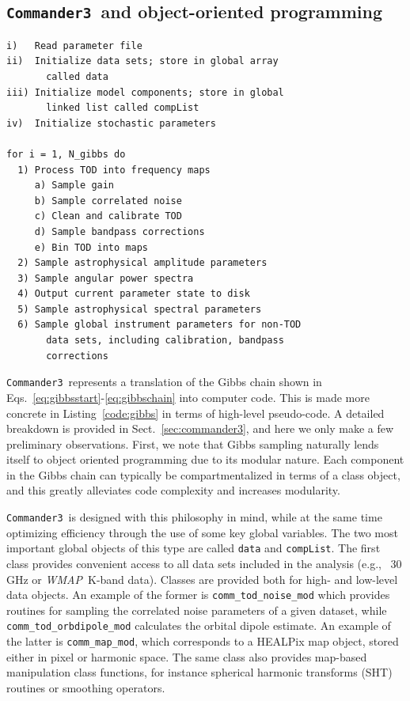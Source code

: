 \documentclass[twocolumn]{aa}
\def\WMAP{\emph{WMAP}}
\def\commanderthree{\texttt{Commander3}}
\begin{document}
\subsection{\commanderthree\ and object-oriented programming}


\newcommand{\find}{\quad}
\newcommand{\ind}{\quad \;}
\begin{lstfloat}[t]
  {\scriptsize
    \begin{tcolorbox}
\begin{lstlisting}
i)   Read parameter file 
ii)  Initialize data sets; store in global array
       called data
iii) Initialize model components; store in global 
       linked list called compList
iv)  Initialize stochastic parameters 

for i = 1, N_gibbs do
  1) Process TOD into frequency maps
     a) Sample gain
     b) Sample correlated noise
     c) Clean and calibrate TOD
     d) Sample bandpass corrections
     e) Bin TOD into maps
  2) Sample astrophysical amplitude parameters
  3) Sample angular power spectra
  4) Output current parameter state to disk
  5) Sample astrophysical spectral parameters
  6) Sample global instrument parameters for non-TOD
       data sets, including calibration, bandpass
       corrections
\end{lstlisting}
    \end{tcolorbox}
}
\caption{Schematic overview of \commanderthree\ execution.}\label{code:gibbs}
\end{lstfloat}

\commanderthree\ represents a translation of the Gibbs chain shown in
Eqs.~\eqref{eq:gibbsstart}-\eqref{eq:gibbschain} into computer code. This is made more concrete
in Listing~\ref{code:gibbs} in terms of high-level pseudo-code. A
detailed breakdown is provided in Sect.~\ref{sec:commander3}, and here
we only make a few preliminary observations. First, we note that Gibbs
sampling naturally lends itself to object oriented programming due to
its modular nature. Each component in the Gibbs chain can typically be
compartmentalized in terms of a class object, and this greatly
alleviates code complexity and increases modularity.

\commanderthree\ is designed with this philosophy in mind, while at
the same time optimizing efficiency through the use of some key global
variables. The two most important global objects of this type are
called \texttt{data} and \texttt{compList}. The first class provides
convenient access to all data sets included in the analysis (e.g.,
\Planck\ 30\,GHz or \WMAP\ K-band data). Classes are provided both for
high- and low-level data objects. An example of the former is
\texttt{comm\_tod\_noise\_mod} which provides routines for sampling
the correlated noise parameters of a given dataset, while
\texttt{comm\_tod\_orbdipole\_mod} calculates the orbital dipole
estimate. An
example of the latter is \texttt{comm\_map\_mod}, which corresponds to
a HEALPix map object, stored either in pixel or harmonic space. The
same class also provides map-based manipulation class
functions, for instance spherical harmonic transforms (SHT) routines
or smoothing operators.
\end{document}
